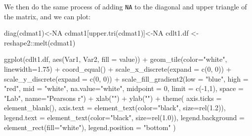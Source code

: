 \documentclass[
  letterpaper,
  DIV=11,
  numbers=noendperiod]{scrreprt}
\newenvironment{Shaded}{\begin{snugshade}}{\end{snugshade}}
\newcommand{\AttributeTok}[1]{\textcolor[rgb]{0.40,0.45,0.13}{#1}}
\newcommand{\ConstantTok}[1]{\textcolor[rgb]{0.56,0.35,0.01}{#1}}
\newcommand{\DecValTok}[1]{\textcolor[rgb]{0.68,0.00,0.00}{#1}}
\newcommand{\FloatTok}[1]{\textcolor[rgb]{0.68,0.00,0.00}{#1}}
\newcommand{\FunctionTok}[1]{\textcolor[rgb]{0.28,0.35,0.67}{#1}}
\newcommand{\NormalTok}[1]{\textcolor[rgb]{0.00,0.23,0.31}{#1}}
\newcommand{\OtherTok}[1]{\textcolor[rgb]{0.00,0.23,0.31}{#1}}
\newcommand{\SpecialCharTok}[1]{\textcolor[rgb]{0.37,0.37,0.37}{#1}}
\newcommand{\StringTok}[1]{\textcolor[rgb]{0.13,0.47,0.30}{#1}}
\begin{document}
We then do the same process of adding \texttt{NA} to the diagonal and
upper triangle of the matrix, and we can plot:

\begin{Shaded}
\begin{Highlighting}[]
\FunctionTok{diag}\NormalTok{(cdmat1)}\OtherTok{\textless{}{-}}\ConstantTok{NA}
\NormalTok{cdmat1[}\FunctionTok{upper.tri}\NormalTok{(cdmat1)]}\OtherTok{\textless{}{-}}\ConstantTok{NA}
\NormalTok{cdlt1.df }\OtherTok{\textless{}{-}}\NormalTok{ reshape2}\SpecialCharTok{::}\FunctionTok{melt}\NormalTok{(cdmat1)}

\FunctionTok{ggplot}\NormalTok{(cdlt1.df, }\FunctionTok{aes}\NormalTok{(Var1, Var2, }\AttributeTok{fill =}\NormalTok{ value)) }\SpecialCharTok{+} 
  \FunctionTok{geom\_tile}\NormalTok{(}\AttributeTok{color=}\StringTok{"white"}\NormalTok{, }\AttributeTok{linewidth=}\FloatTok{1.75}\NormalTok{) }\SpecialCharTok{+}
  \FunctionTok{coord\_equal}\NormalTok{() }\SpecialCharTok{+}
  \FunctionTok{scale\_x\_discrete}\NormalTok{(}\AttributeTok{expand =} \FunctionTok{c}\NormalTok{(}\DecValTok{0}\NormalTok{, }\DecValTok{0}\NormalTok{)) }\SpecialCharTok{+}
  \FunctionTok{scale\_y\_discrete}\NormalTok{(}\AttributeTok{expand =} \FunctionTok{c}\NormalTok{(}\DecValTok{0}\NormalTok{, }\DecValTok{0}\NormalTok{)) }\SpecialCharTok{+} 
  \FunctionTok{scale\_fill\_gradient2}\NormalTok{(}\AttributeTok{low =} \StringTok{"blue"}\NormalTok{, }\AttributeTok{high =} \StringTok{"red"}\NormalTok{, }\AttributeTok{mid =} \StringTok{"white"}\NormalTok{,}
                       \AttributeTok{na.value=}\StringTok{"white"}\NormalTok{,}
                       \AttributeTok{midpoint =} \DecValTok{0}\NormalTok{, }\AttributeTok{limit =} \FunctionTok{c}\NormalTok{(}\SpecialCharTok{{-}}\DecValTok{1}\NormalTok{,}\DecValTok{1}\NormalTok{), }\AttributeTok{space =} \StringTok{"Lab"}\NormalTok{, }
                       \AttributeTok{name=}\StringTok{"Pearson\textquotesingle{}s r"}\NormalTok{)  }\SpecialCharTok{+}
  \FunctionTok{xlab}\NormalTok{(}\StringTok{""}\NormalTok{) }\SpecialCharTok{+} 
  \FunctionTok{ylab}\NormalTok{(}\StringTok{""}\NormalTok{) }\SpecialCharTok{+}
  \FunctionTok{theme}\NormalTok{(}
    \AttributeTok{axis.ticks =} \FunctionTok{element\_blank}\NormalTok{(), }
    \AttributeTok{axis.text =} \FunctionTok{element\_text}\NormalTok{(}\AttributeTok{color=}\StringTok{"black"}\NormalTok{, }\AttributeTok{size=}\FunctionTok{rel}\NormalTok{(}\FloatTok{1.2}\NormalTok{)),}
    \AttributeTok{legend.text =} \FunctionTok{element\_text}\NormalTok{(}\AttributeTok{color=}\StringTok{"black"}\NormalTok{, }\AttributeTok{size=}\FunctionTok{rel}\NormalTok{(}\FloatTok{1.0}\NormalTok{)),}
    \AttributeTok{legend.background =} \FunctionTok{element\_rect}\NormalTok{(}\AttributeTok{fill=}\StringTok{"white"}\NormalTok{),}
    \AttributeTok{legend.position =} \StringTok{"bottom"}
\NormalTok{  )}
\end{Highlighting}
\end{Shaded}
\end{document}

